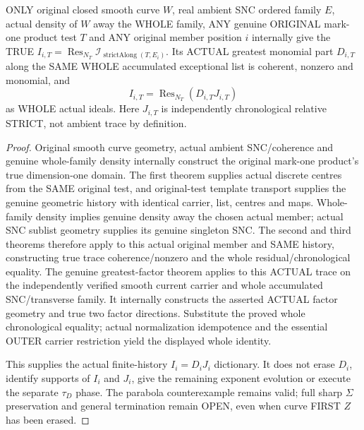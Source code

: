 \begin{theorem}[ONLY original smooth-curve tests give EVERY literal true ambient member factor $I_i=D_iJ_i$]
\label{hir:sharp-original-curve-finite-true-ambient-member-factor-dictionary}
\leanok
ONLY original closed smooth curve $W$, real ambient SNC ordered family $E$,
actual density of $W$ away the WHOLE family, ANY genuine ORIGINAL mark-one
product test $T$ and ANY original member position $i$ internally give the
TRUE $I_{i,T}=\operatorname{Res}_{N_T}\mathcal I_{\operatorname{strictAlong}(T,E_i)}$.
Its ACTUAL greatest monomial part $D_{i,T}$ along the SAME WHOLE accumulated
exceptional list is coherent, nonzero and monomial, and
\[
 I_{i,T}=\operatorname{Res}_{N_T}(D_{i,T}J_{i,T})
\]
as WHOLE actual ideals. Here $J_{i,T}$ is independently chronological
relative STRICT, not ambient trace by definition.
\end{theorem}
\begin{proof}
Original smooth curve geometry, actual ambient SNC/coherence and genuine
whole-family density internally construct the original mark-one product's
true dimension-one domain. The first theorem supplies actual discrete centres
from the SAME original test, and original-test template transport supplies
the genuine geometric history with identical carrier, list, centres and maps.
Whole-family density implies genuine density away the chosen actual member;
actual SNC sublist geometry supplies its genuine singleton SNC.
The second and third theorems therefore apply to this actual original member
and SAME history, constructing true trace coherence/nonzero and the whole
residual/chronological equality. The genuine greatest-factor theorem applies
to this ACTUAL trace on the independently verified smooth current carrier
and whole accumulated SNC/transverse family. It internally constructs the
asserted ACTUAL factor geometry and true two factor directions. Substitute
the proved whole chronological equality; actual normalization idempotence
and the essential OUTER carrier restriction yield the displayed whole identity.

This supplies the actual finite-history $I_i=D_iJ_i$ dictionary. It does not
erase $D_i$, identify supports of $I_i$ and $J_i$, give the remaining exponent
evolution or execute the separate $\tau_D$ phase. The parabola counterexample
remains valid; full sharp $\Sigma$ preservation and general termination
remain OPEN, even when curve FIRST $Z$ has been erased.
\end{proof}
